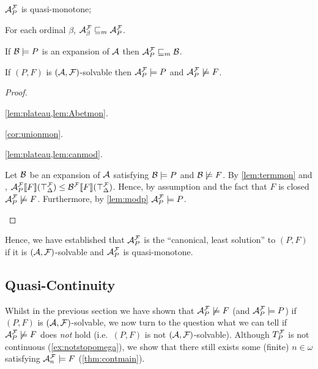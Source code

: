 \documentclass[a4paper,twoside,notitlepage,openright,11pt]{report}
\begin{document}
  \begin{theorem}
    \label{lem:propap}
    \begin{thmlist}
    \item\label{it:aspmon}$\mathcal A^\mathcal F_P$ is quasi-monotone;
    \item\label{it:allordsmaller} For each ordinal $\beta$, $\mathcal A^\mathcal F_\beta\sqsubseteq_m\mathcal A^\mathcal F_P$.
    \item\label{lem:canmod2} If $\mathcal B\models P$ is an expansion of $\mathcal A$ then $\mathcal A^\mathcal F_P\sqsubseteq_m\mathcal B$.
    \item\label{thm:canmod} If $(P,F)$ is $(\mathcal A,\mathcal F)$-solvable then $\mathcal A^\mathcal F_P\models P$ and $\mathcal A^\mathcal F_P\not\models F$.
    \end{thmlist}
  \end{theorem}
  \begin{proof}
    \begin{thmlist}
    \item \cref{lem:plateau,lem:Abetmon}.
    \item \cref{cor:unionmon}.
    \item \cref{lem:plateau,lem:canmod}.
    \item Let $\mathcal B$ be an expansion of $\mathcal A$ satisfying $\mathcal B\models P$ and $\mathcal B\not\models F$. By \cref{lem:termmon} and , ${\mathcal A_P^\mathcal F}\llbracket F\rrbracket(\top_\Delta^\mathcal F)\leq{\mathcal B^\mathcal F}\llbracket F\rrbracket(\top_\Delta^\mathcal F)$. Hence, by assumption and the fact that $F$ is closed $\mathcal A^\mathcal F_P\not\models F$. Furthermore, by \cref{lem:modp} $\mathcal A^\mathcal F_P\models P$.\qedhere
  \end{thmlist}
  \end{proof}

  Hence, we have established that $\mathcal A^\mathcal F_P$ is the ``canonical, least solution'' to $(P,F)$ if it is $(\mathcal A,\mathcal F)$-solvable and $\mathcal A^\mathcal F_P$ is quasi-monotone.

\subsection{Quasi-Continuity}
\label{subsec:quasicont}
\label{SUBSEC:QUASICONT}
Whilst in the previous section we have shown that $\mathcal A^\mathcal F_P\not\models F$ (and $\mathcal A_P^\mathcal F\models P$) if $(P,F)$ is $(\mathcal A,\mathcal F)$-solvable, we now turn to the question what we can tell if $\mathcal A_P^\mathcal F\not\models F$ does \emph{not} hold (i.e.\ $(P,F)$ is not $(\mathcal A,\mathcal F)$-solvable). Although $T_P^\mathcal F$ is not continuous (\cref{ex:notstopomega}), we show that there still exists some (finite) $n\in\omega$ satisfying $\mathcal A^\mathcal F_n\models F$ (\cref{thm:contmain}). 
\end{document}
